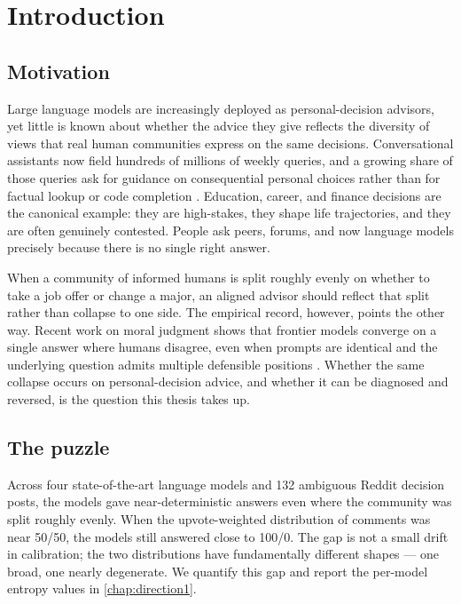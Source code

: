 \chapter{Introduction}
\label{chap:introduction}

\section{Motivation}
\label{sec:motivation}

Large language models are increasingly deployed as personal-decision
advisors, yet little is known about whether the advice they give
reflects the diversity of views that real human communities express on
the same decisions. Conversational assistants now field hundreds of
millions of weekly queries, and a growing share of those queries ask
for guidance on consequential personal choices rather than for
factual lookup or code completion \citep{chatterji-2025-chatgpt,
tamkin-2024-clio}. Education, career, and finance decisions are the
canonical example: they are high-stakes, they shape life trajectories,
and they are often genuinely contested. People ask peers, forums, and
now language models precisely because there is no single right answer.

When a community of informed humans is split roughly evenly on whether
to take a job offer or change a major, an aligned advisor should
reflect that split rather than collapse to one side. The empirical
record, however, points the other way. Recent work on moral judgment
shows that frontier models converge on a single answer where humans
disagree, even when prompts are identical and the underlying question
admits multiple defensible positions \citep{russo-2026-pluralistic}.
Whether the same collapse occurs on personal-decision advice, and
whether it can be diagnosed and reversed, is the question this thesis
takes up.

\section{The puzzle}
\label{sec:puzzle}

Across four state-of-the-art language models and 132 ambiguous Reddit
decision posts, the models gave near-deterministic answers even where
the community was split roughly evenly. When the upvote-weighted
distribution of comments was near 50/50, the models still answered
close to 100/0. The gap is not a small drift in calibration; the two
distributions have fundamentally different shapes --- one broad, one
nearly degenerate. We quantify this gap and report the per-model
entropy values in \cref{chap:direction1}.

